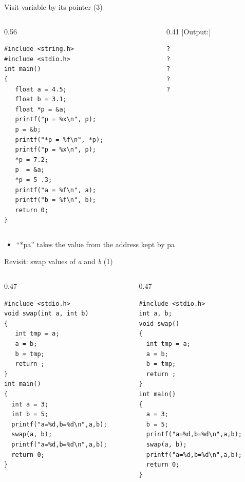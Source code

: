 \begin{frame}[fragile]{Visit variable by its pointer (3)}
\vspace{-0.03in}
\begin{columns}
\begin{column}{0.56\linewidth}
\begin{lstlisting}[xleftmargin=0.02\linewidth, linewidth=0.98\linewidth]
#include <string.h>
#include <stdio.h>
int main()
{
   float a = 4.5;
   float b = 3.1;
   float *p = &a;
   printf("p = %x\n", p);
   p = &b;
   printf("*p = %f\n", *p);
   printf("p = %x\n", p);
   *p = 7.2;
   p  = &a;
   *p = 5 .3;
   printf("a = %f\n", a);
   printf("b = %f\n", b);
   return 0;
}
\end{lstlisting}
\end{column}
\begin{column}{0.41\linewidth}
[Output:]
\begin{lstlisting}
?
?
?
?
?
\end{lstlisting}
\end{column}
\end{columns}
\vspace{-0.1in}
\begin{itemize}
	\item {``*pa'' takes the value from the address kept by pa}
\end{itemize}
\end{frame}

\begin{frame}[fragile]{Revisit: swap values of \textit{a} and \textit{b} (1)}
\vspace{-0.03in}
\begin{columns}
\begin{column}{0.47\linewidth}
\begin{lstlisting}
#include <stdio.h>
void swap(int a, int b)
{
   int tmp = a;
   a = b;
   b = tmp;
   return ;
}
int main()
{
  int a = 3; 
  int b = 5;
  printf("a=%d,b=%d\n",a,b);
  swap(a, b);
  printf("a=%d,b=%d\n",a,b);
  return 0;
}
\end{lstlisting}
\end{column}
\begin{column}{0.47\linewidth}
\begin{lstlisting}[xleftmargin=0.005\linewidth]
#include <stdio.h>
int a, b;
void swap()
{
  int tmp = a;
  a = b;
  b = tmp;
  return ;
}
int main()
{
  a = 3; 
  b = 5;
  printf("a=%d,b=%d\n",a,b);
  swap(a, b);
  printf("a=%d,b=%d\n",a,b);
  return 0;
}
\end{lstlisting}
\end{column}
\end{columns}
\end{frame}

